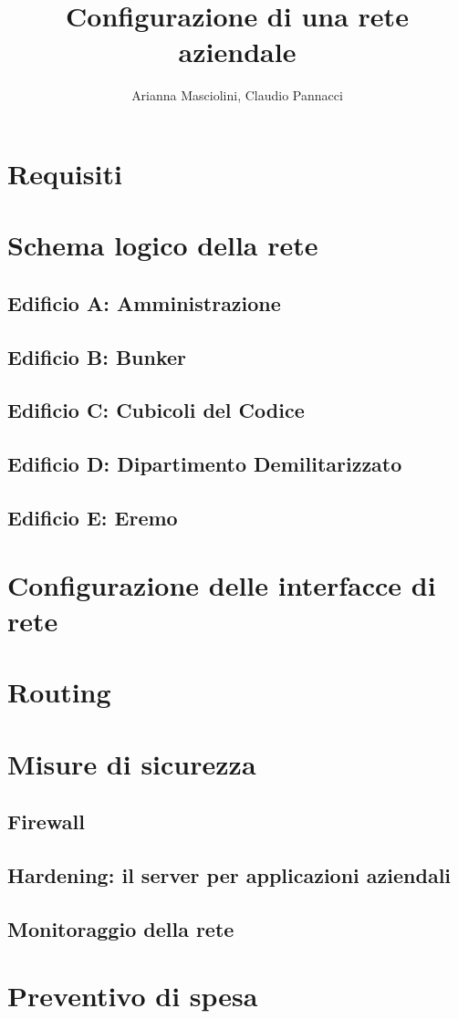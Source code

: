 \documentclass[a4paper,11pt]{article}
\title{Configurazione di una rete aziendale}
\author{Arianna Masciolini, Claudio Pannacci}
\begin{document}
\maketitle
\newpage
\tableofcontents
\newpage
\section{Requisiti}
\newpage
\section{Schema logico della rete}
\subsection{Edificio A: Amministrazione}
\subsection{Edificio B: Bunker}
\subsection{Edificio C: Cubicoli del Codice}
\subsection{Edificio D: Dipartimento Demilitarizzato}
\subsection{Edificio E: Eremo}
\newpage
\section{Configurazione delle interfacce di rete} %
\section{Routing}
\section{Misure di sicurezza}
\subsection{Firewall}
\subsection{Hardening: il server per applicazioni aziendali}
\subsection{Monitoraggio della rete}
\newpage
\section{Preventivo di spesa}
\end{document}
